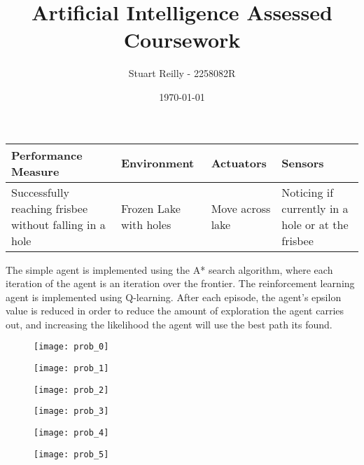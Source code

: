 \documentclass[11pt]{article}
\begin{document}
    \title{Artificial Intelligence Assessed Coursework}
    \date{\today}
    \author{Stuart Reilly - 2258082R}
    \maketitle

    \begin{tabulary}{0.9\linewidth}{|L|L|L|L|}
        \hline
        Performance Measure                                     & Environment            & Actuators        & Sensors \\
        \hline
        Successfully reaching frisbee without falling in a hole & Frozen Lake with holes & Move across lake & Noticing if currently in a hole or at the frisbee \\
        \hline
    \end{tabulary}

    The simple agent is implemented using the A* search algorithm, where each iteration of the agent is an iteration
    over the frontier.
    The reinforcement learning agent is implemented using Q-learning.
    After each episode, the agent's epsilon value is reduced in order to reduce the amount of exploration the agent
    carries out, and increasing the likelihood the agent will use the best path its found.

    \begin{figure}[H]
        \texttt{[image: prob\_0]}
    \end{figure}

    \begin{figure}[H]
        \texttt{[image: prob\_1]}
    \end{figure}

    \begin{figure}[H]
        \texttt{[image: prob\_2]}
    \end{figure}

    \begin{figure}[H]
        \texttt{[image: prob\_3]}
    \end{figure}

    \begin{figure}[H]
        \texttt{[image: prob\_4]}
    \end{figure}

    \begin{figure}[H]
        \texttt{[image: prob\_5]}
    \end{figure}
\end{document}
